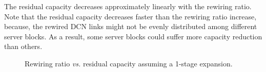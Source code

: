 \documentclass[letterpaper,twocolumn,10pt]{article}
\begin{document}
The residual capacity decreases approximately linearly with the rewiring ratio. Note that the residual capacity decreases faster than the rewiring ratio increase, because, the rewired DCN links might not be evenly distributed among different server blocks. As a result, some server blocks could suffer more capacity reduction than others.

\begin{figure}[ht]
  \centering
\vspace{-1ex}
  \caption{Rewiring ratio \emph{vs.} residual capacity assuming a 1-stage expansion.}\label{expansioncapacity}
\end{figure}
\end{document}
